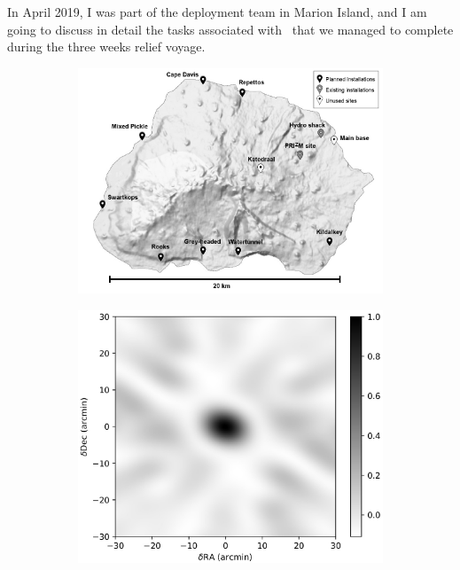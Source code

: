 In April 2019, I was part of the deployment team in Marion Island, and I am going to discuss in detail the tasks associated with \albatros\ that we managed to complete during the three weeks relief voyage.  

\begin{figure}
	\centering
	\begin{subfigure}[t]{0.6\textwidth}
		\centering
		\includegraphics[width=\linewidth]{Figures/marion_map_annotated.jpg} 
		\caption{} \label{Fig:marion_map}
	\end{subfigure}
	\hfill
	\begin{subfigure}[t]{0.39\textwidth}
		\centering
		\includegraphics[width=\linewidth]{Figures/marion_beam_huts_2020.jpg}

\end{subfigure}
\end{figure}
